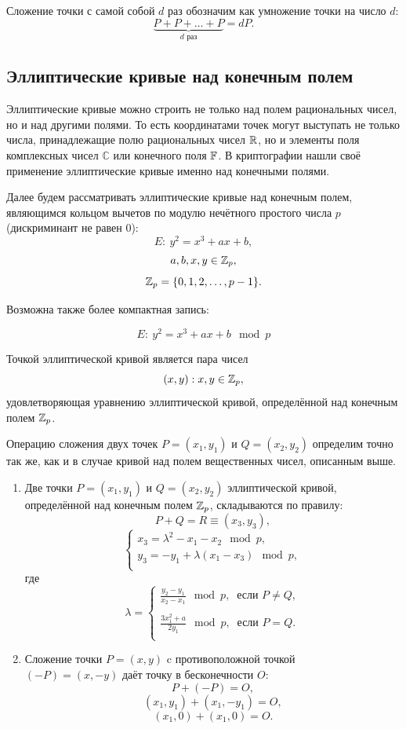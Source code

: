 Сложение точки с самой собой $d$ раз обозначим как умножение точки на число $d$:
    \[ \underbrace{P + P + \ldots + P}_{d \text{ раз}} = d P. \]


\subsection{Эллиптические кривые над конечным полем}

Эллиптические кривые можно строить не только над полем рациональных чисел, но и над другими полями. То есть координатами точек могут выступать не только числа, принадлежащие полю рациональных чисел $\mathbb{R}$, но и элементы поля комплексных чисел $\mathbb{C}$ или конечного поля $\mathbb{F}$. В криптографии нашли своё применение эллиптические кривые именно над конечными полями.

Далее будем рассматривать эллиптические кривые над конечным полем, являющимся кольцом вычетов по модулю нечётного простого числа $p$ (дискриминант не равен 0):
    \[ E: ~ y^2 = x^3 + a x + b, \]
    \[ a, b, x, y \in \mathbb{Z}_p, \]
    \[ \mathbb{Z}_p = \{0, 1, 2,  \ldots,  p-1\}.\]

Возможна также более компактная запись:

    \[ E: ~ y^2 = x^3 + a x + b \mod p\]

Точкой эллиптической кривой является пара чисел
    \[ (x,y): x, y \in \mathbb{Z}_p, \]
удовлетворяющая уравнению эллиптической кривой, определённой над конечным полем $\mathbb{Z}_p$.

Операцию сложения двух точек $P = (x_1, y_1)$ и $Q = (x_2, y_2)$ определим точно так же, как и в случае кривой над полем вещественных чисел, описанным выше.

\begin{enumerate}
    \item Две точки $P = (x_1, y_1)$ и $Q = (x_2, y_2)$ эллиптической кривой, определённой над конечным полем $\mathbb{Z}_p$, складываются по правилу:
        \[
            P + Q = R \equiv (x_3, y_3),
        \] \[
            \left\{ \begin{array}{l}
                x_3 = \lambda^2 - x_1 - x_2 \mod p,\\
                y_3 = - y_1 + \lambda (x_1 - x_3) \mod p,\\
            \end{array} \right.
        \]
        где
        \[
            \lambda = \left\{ \begin{array}{l}
                \frac{y_2 - y_1}{x_2 - x_1} \mod p, ~ \text{ если } P \ne Q, \\
                \\
                \frac{3 x_1^2 + a}{2 y_1} \mod p, ~ \text{ если } P = Q. \\
            \end{array} \right.
        \]
    \item Сложение точки $P=(x,y)$ c противоположной точкой \\
        $(-P) = (x,-y)$ даёт точку в бесконечности $O$:
        \[ P + (-P) = O, \]
        \[ (x_1, y_1) + (x_1, -y_1) = O, \]
        \[ (x_1, 0) + (x_1, 0) = O. \]
\end{enumerate}

